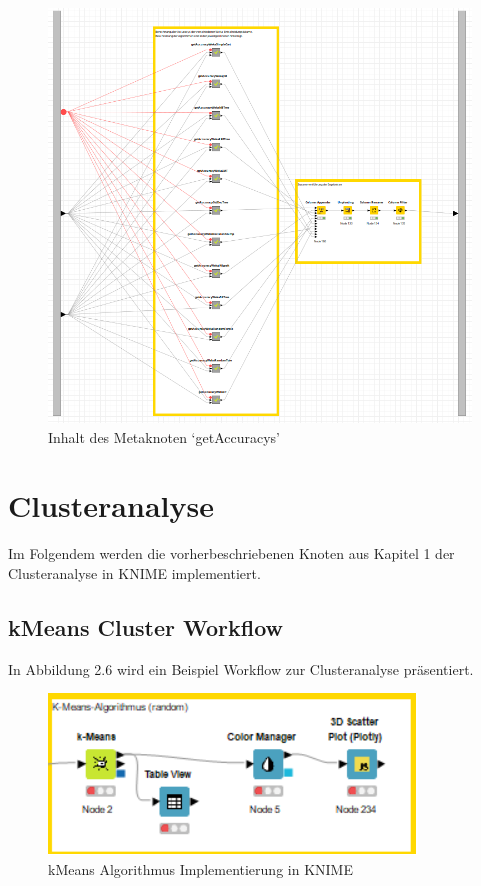 \documentclass[12pt,					%
							 oneside,			%
							 a4paper,			%
							 halfparskip,		%
							 liststotoc,			%
							 bibtotoc,			%
							 fleqn,				%
							 pointlessnumbers]	%
							 {scrreprt}
\begin{document}
		\begin{figure}[h]
			\begin{center}
				\includegraphics[scale=0.45]{pictures/trees-workflow-getAccuracys.png}
				\caption{Inhalt des Metaknoten `getAccuracys'}									
				\label{figure:trees:workflow:getaccuracys}
			\end{center}
		\end{figure}
		
	\newpage

	\section{Clusteranalyse}
	Im Folgendem werden die vorherbeschriebenen Knoten aus Kapitel 1 der Clusteranalyse in KNIME implementiert.
		
		\subsection{kMeans Cluster Workflow}
		In Abbildung 2.6 wird ein Beispiel Workflow zur Clusteranalyse präsentiert. 
		
		\begin{figure}[!h]
			\begin{center}
				\includegraphics[scale=1]{pictures/kmeans.png}
				\caption{kMeans Algorithmus Implementierung in KNIME}
			\end{center}
		\end{figure}
		
\end{document}
